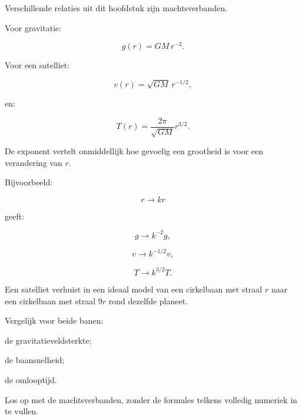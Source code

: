 \documentclass{ximera}
\begin{document}


Verschillende relaties uit dit hoofdstuk zijn machtsverbanden.

Voor gravitatie:

\[
g(r)=GM\,r^{-2}.
\]

Voor een satelliet:

\[
v(r)=\sqrt{GM}\,r^{-1/2},
\]

en:

\[
T(r)=\frac{2\pi}{\sqrt{GM}}r^{3/2}.
\]

De exponent vertelt onmiddellijk hoe gevoelig een grootheid is voor een
verandering van $r$.

Bijvoorbeeld:

\[
r\rightarrow kr
\]

geeft:

\[
g\rightarrow k^{-2}g,
\]

\[
v\rightarrow k^{-1/2}v,
\]

\[
T\rightarrow k^{3/2}T.
\]


\begin{oefening}{\oefG}

Een satelliet verhuist in een ideaal model van een cirkelbaan met
straal $r$ naar een cirkelbaan met straal $9r$ rond dezelfde planeet.

Vergelijk voor beide banen:

\begin{question}
de gravitatieveldsterkte;
\end{question}

\begin{question}
de baansnelheid;
\end{question}

\begin{question}
de omlooptijd.
\end{question}

Los op met de machtsverbanden, zonder de formules telkens volledig
numeriek in te vullen.

\end{oefening}


\end{document}
